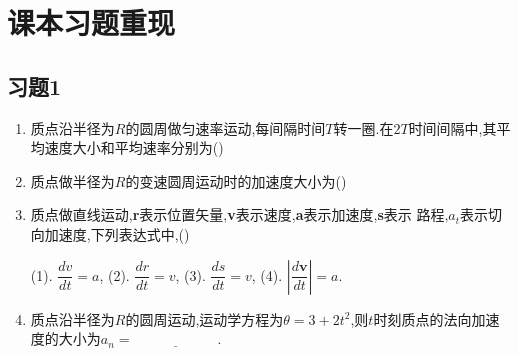 \section{课本习题重现}
\subsection{习题1}

\begin{enumerate}

\item[\textbf{1-4}] 质点沿半径为$R$的圆周做匀速率运动,每间隔时间$T$转一圈.在$2T$时间间隔中,其平均速度大小和平均速率分别为(\quad)



\item[\textbf{1-5}] 质点做半径为$R$的变速圆周运动时的加速度大小为(\quad)


\item[\textbf{1-7}] 质点做直线运动,\textbf{r}表示位置矢量,\textbf{v}表示速度,\textbf{a}表示加速度,\textbf{s}表示 路程,$a_t$表示切向加速度,下列表达式中,(\quad)

(1). $\dfrac{dv}{dt} = a$,
(2). $\dfrac{{dr}}{dt} = {v}$,
(3). $\dfrac{ds}{dt} = v$,
(4). $\left| \dfrac{d\mathbf{v}}{dt} \right| = a$.


\item[\textbf{1-12}] 质点沿半径为$R$的圆周运动,运动学方程为$\theta  = 3 + 2t^2$,则$t$时刻质点的法向加速度的大小为$a_n = \underline{\hspace{6em}}.$



\end{enumerate}
